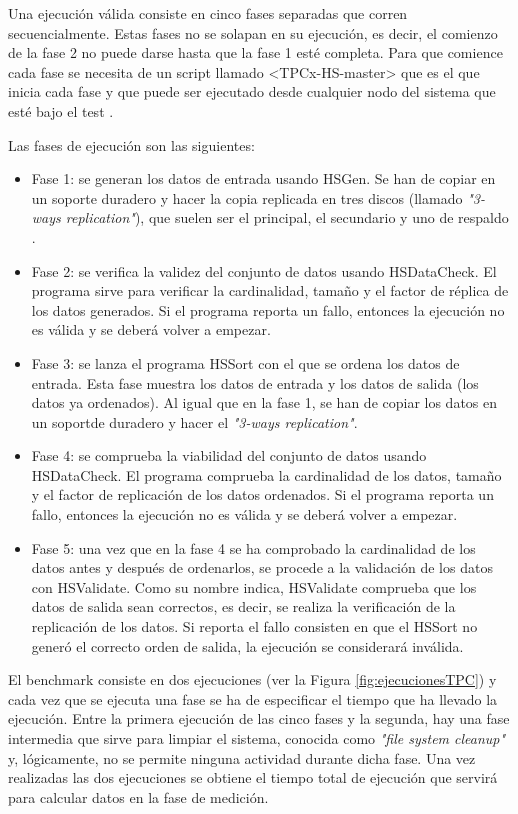 \documentclass[10pt]{article}
\begin{document}
		Una ejecución válida consiste en cinco fases separadas que corren secuencialmente. Estas fases no se solapan en su ejecución, es decir, el comienzo de la fase 2 no puede darse hasta que la fase 1 esté completa. Para que comience cada fase se necesita de un script llamado <TPCx-HS-master> que es el que inicia cada fase y que puede ser ejecutado desde cualquier nodo del sistema que esté bajo el test \cite{tpcxhs}.

		
		Las fases de ejecución son las siguientes:
		
		\begin{itemize}
			\item Fase 1: se generan los datos de entrada usando HSGen. Se han de copiar en un soporte duradero y hacer la copia replicada en tres discos (llamado \textit{"3-ways replication"}), que suelen ser el principal, el secundario y uno de respaldo \cite{replication}.
			\item Fase 2: se verifica la validez del conjunto de datos usando HSDataCheck. El programa sirve para verificar la cardinalidad, tamaño y el factor de réplica de los datos generados. Si el programa reporta un fallo, entonces la ejecución no es válida y se deberá volver a empezar.
			\item Fase 3: se lanza el programa HSSort con el que se ordena los datos de entrada. Esta fase muestra los datos de entrada y los datos de salida (los datos ya ordenados). Al igual que en la fase 1, se han de copiar los datos en un soportde duradero y hacer el \textit{"3-ways replication"}.
			\item Fase 4: se comprueba la viabilidad del conjunto de datos usando HSDataCheck. El programa comprueba la cardinalidad de los datos, tamaño y el factor de replicación de los datos ordenados. Si el programa reporta un fallo, entonces la ejecución no es válida y se deberá volver a empezar.
			\item Fase 5: una vez que en la fase 4 se ha comprobado la cardinalidad de los datos antes y después de ordenarlos, se procede a la validación de los datos con HSValidate. Como su nombre indica, HSValidate comprueba que los datos de salida sean correctos, es decir, se realiza la verificación de la replicación de los datos. Si reporta el fallo consisten en que el HSSort no generó el correcto orden de salida, la ejecución se considerará inválida.
		\end{itemize}
		
		El benchmark consiste en dos ejecuciones (ver la Figura \ref{fig:ejecucionesTPC}) y cada vez que se ejecuta una fase se ha de especificar el tiempo que ha llevado la ejecución. Entre la primera ejecución de las cinco fases y la segunda, hay una fase intermedia que sirve para limpiar el sistema, conocida como \textit{"file system cleanup"} y, lógicamente, no se permite ninguna actividad durante dicha fase. Una vez realizadas las dos ejecuciones se obtiene el tiempo total de ejecución que servirá para calcular datos en la fase de medición.
		
\end{document}
